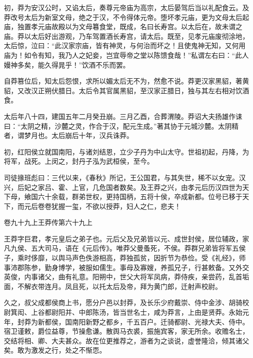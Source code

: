 \documentclass[12pt,UTF8]{ctexbook}
\begin{document}
初，莽为安汉公时，又谄太后，奏尊元帝庙为高宗，太后晏驾后当以礼配食云。及莽改号太后为新室文母，绝之于汉，不令得体元帝。堕坏孝元庙，更为文母太后起庙，独置孝元庙故殿以为文母篹食堂，既成，名曰长寿宫。以太后在，故未谓之庙。莽以太后好出游观，乃车驾置酒长寿宫，请太后。既至，见孝元庙废彻涂地，太后惊，泣曰：“此汉家宗庙，皆有神灵，与何治而坏之！且使鬼神无知，又何用庙为！如令有知，我乃人之妃妾，岂宜辱帝之堂以陈馈食哉！”私谓左右曰：“此人嫚神多矣，能久得晁乎！”饮酒不乐而罢。



自莽篡位后，知太后怨恨，求所以媚太后无不为，然愈不说。莽更汉家黑貂，著黄貂，又改汉正朔伏腊日。太后令其官属黑貂，至汉家正腊日，独与其左右相对饮酒食。



太后年八十四，建国五年二月癸丑崩。三月乙酉，合葬渭陵。莽诏大夫扬雄作诔曰：“太阴之精，沙麓之灵，作合于汉，配元生成。”著其协于元城沙麓。太阴精者，谓梦月也。太后崩后十年，汉兵诛莽。



初，红阳侯立就国南阳，与诸刘结恩，立少子丹为中山太守。世祖初起，丹降，为将军，战死。上闵之，封丹子泓为武桓侯，至今。



司徒掾班彪曰：三代以来，《春秋》所记，王公国君，与其失世，稀不以女宠。汉兴，后妃之家吕、霍、上官，几危国者数矣。及王莽之兴，由孝元后历汉四世为天下母，飨国六十余载，群弟世权，更持国柄，五将十侯，卒成新都。位号已移于天下，而元后卷卷犹握一玺，不欲以授莽，妇人之仁，悲夫！





卷九十九上王莽传第六十九上



王莽字巨君，孝元皇后之弟子也。元后父及兄弟皆以元、成世封侯，居位辅政，家凡九侯、五大司马，语在《元后传》。唯莽父曼蚤死，不侯。莽群兄弟皆将军五侯子，乘时侈靡，以舆马声色佚游相高，莽独孤贫，因折节为恭俭。受《礼经》，师事沛郡陈参，勤身博学，被服如儒生。事母及寡嫂，养孤兄子，行甚敕备。又外交英俊，内事诸父，曲有礼意。阳朔中，世父大将军凤病，莽侍疾，亲尝药，乱首垢面，不解衣带连月。凤且死，以托太后及帝，拜为黄门郎，迁射声校尉。



久之，叔父成都侯商上书，愿分户邑以封莽，及长乐少府戴崇、侍中金涉、胡骑校尉箕闳、上谷都尉阳并、中郎陈汤，皆当世名士，咸为莽言，上由是贤莽。永始元年，封莽为新都侯，国南阳新野之都乡，千五百户。迁骑都尉、光禄大夫、侍中。宿卫谨敕，爵位益尊，节操愈谦。散舆马衣裘，振施宾客，家无所余。收赡名士，交结将相、卿、大夫甚众。故在位更推荐之，游者为之谈说，虚誉隆洽，倾其诸父矣。敢为激发之行，处之不惭恧。
\end{document}
